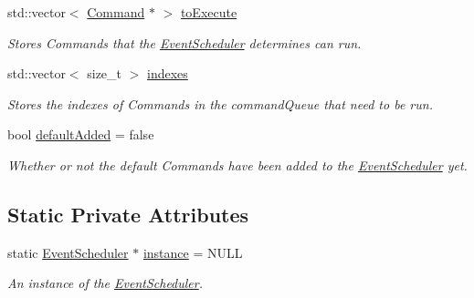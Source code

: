 \begin{DoxyCompactItemize}
std\+::vector$<$ \mbox{\hyperlink{classlib_iterative_robot_1_1_command}{Command}} $\ast$ $>$ \mbox{\hyperlink{classlib_iterative_robot_1_1_event_scheduler_a91ac686fb045bce48f6debdb0a351c20}{to\+Execute}}
\begin{DoxyCompactList}\small\item\em Stores Commands that the \mbox{\hyperlink{classlib_iterative_robot_1_1_event_scheduler}{Event\+Scheduler}} determines can run. \end{DoxyCompactList}\item 
\mbox{\label{classlib_iterative_robot_1_1_event_scheduler_a1abfda2ac89947e8bb5c06478c87a5ba}} 
std\+::vector$<$ size\+\_\+t $>$ \mbox{\hyperlink{classlib_iterative_robot_1_1_event_scheduler_a1abfda2ac89947e8bb5c06478c87a5ba}{indexes}}
\begin{DoxyCompactList}\small\item\em Stores the indexes of Commands in the command\+Queue that need to be run. \end{DoxyCompactList}\item 
\mbox{\label{classlib_iterative_robot_1_1_event_scheduler_ab621dadcaf39710a2c591c72ade16885}} 
bool \mbox{\hyperlink{classlib_iterative_robot_1_1_event_scheduler_ab621dadcaf39710a2c591c72ade16885}{default\+Added}} = false
\begin{DoxyCompactList}\small\item\em Whether or not the default Commands have been added to the \mbox{\hyperlink{classlib_iterative_robot_1_1_event_scheduler}{Event\+Scheduler}} yet. \end{DoxyCompactList}\end{DoxyCompactItemize}
\subsection*{Static Private Attributes}
\begin{DoxyCompactItemize}
\item 
\mbox{\label{classlib_iterative_robot_1_1_event_scheduler_a1f4587720421057eebddc0248bf9a05f}} 
static \mbox{\hyperlink{classlib_iterative_robot_1_1_event_scheduler}{Event\+Scheduler}} $\ast$ \mbox{\hyperlink{classlib_iterative_robot_1_1_event_scheduler_a1f4587720421057eebddc0248bf9a05f}{instance}} = N\+U\+LL
\begin{DoxyCompactList}\small\item\em An instance of the \mbox{\hyperlink{classlib_iterative_robot_1_1_event_scheduler}{Event\+Scheduler}}. \end{DoxyCompactList}\end{DoxyCompactItemize}


